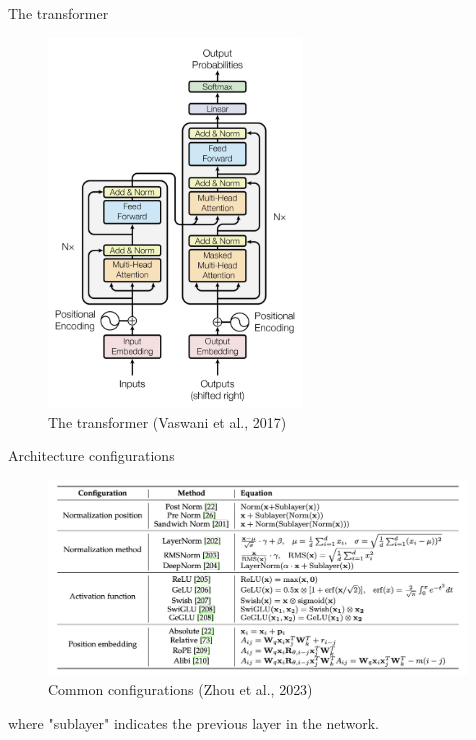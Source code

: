 \documentclass[10pt]{beamer}
\begin{document}
\begin{frame}{The transformer}

\begin{figure}[h]
\centering
\includegraphics[width=0.6\textwidth]{fig/Vaswani_1_transformer}
\caption{The transformer (Vaswani et al., 2017)}
\end{figure}

\end{frame}

\begin{frame}{Architecture configurations}

\begin{figure}[h]
\centering
\includegraphics[width=0.99\textwidth]{fig/zhou_2023_tab4}
\caption{Common configurations (Zhou et al., 2023)}
\end{figure}
where "sublayer" indicates the previous layer in the network.

\end{frame}
\end{document}
